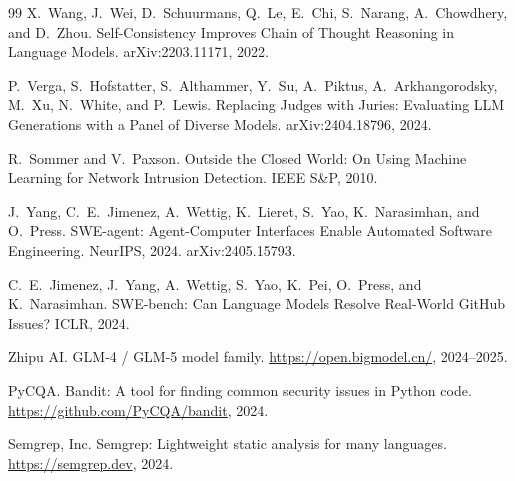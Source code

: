 \documentclass{article}
\begin{document}
\begin{thebibliography}{99}
 X.~Wang, J.~Wei, D.~Schuurmans, Q.~Le, E.~Chi, S.~Narang, A.~Chowdhery, and D.~Zhou.
Self-Consistency Improves Chain of Thought Reasoning in Language Models.
arXiv:2203.11171, 2022.

 P.~Verga, S.~Hofstatter, S.~Althammer, Y.~Su, A.~Piktus, A.~Arkhangorodsky, M.~Xu, N.~White, and P.~Lewis.
Replacing Judges with Juries: Evaluating LLM Generations with a Panel of Diverse Models.
arXiv:2404.18796, 2024.

 R.~Sommer and V.~Paxson.
Outside the Closed World: On Using Machine Learning for Network Intrusion Detection.
IEEE S\&P, 2010.

 J.~Yang, C.~E.~Jimenez, A.~Wettig, K.~Lieret, S.~Yao, K.~Narasimhan, and O.~Press.
SWE-agent: Agent-Computer Interfaces Enable Automated Software Engineering.
NeurIPS, 2024. arXiv:2405.15793.

 C.~E.~Jimenez, J.~Yang, A.~Wettig, S.~Yao, K.~Pei, O.~Press, and K.~Narasimhan.
SWE-bench: Can Language Models Resolve Real-World GitHub Issues?
ICLR, 2024.

 Zhipu AI. GLM-4 / GLM-5 model family. \url{https://open.bigmodel.cn/}, 2024--2025.

 PyCQA. Bandit: A tool for finding common security issues in Python code. \url{https://github.com/PyCQA/bandit}, 2024.

 Semgrep, Inc. Semgrep: Lightweight static analysis for many languages. \url{https://semgrep.dev}, 2024.

\end{thebibliography}
\end{document}
